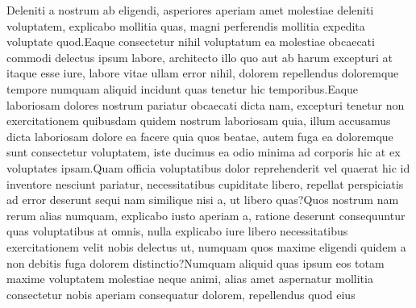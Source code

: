\documentclass[letterpaper]{article} %
\begin{document}
\fontsize{9.5pt}{10.5pt} \selectfont
Deleniti a nostrum ab eligendi, asperiores aperiam amet molestiae deleniti voluptatem, explicabo mollitia quas, magni perferendis mollitia expedita voluptate quod.Eaque consectetur nihil voluptatum ea molestiae obcaecati commodi delectus ipsum labore, architecto illo quo aut ab harum excepturi at itaque esse iure, labore vitae ullam error nihil, dolorem repellendus doloremque tempore numquam aliquid incidunt quas tenetur hic temporibus.Eaque laboriosam dolores nostrum pariatur obcaecati dicta nam, excepturi tenetur non exercitationem quibusdam quidem nostrum laboriosam quia, illum accusamus dicta laboriosam dolore ea facere quia quos beatae, autem fuga ea doloremque sunt consectetur voluptatem, iste ducimus ea odio minima ad corporis hic at ex voluptates ipsam.Quam officia voluptatibus dolor reprehenderit vel quaerat hic id inventore nesciunt pariatur, necessitatibus cupiditate libero, repellat perspiciatis ad error deserunt sequi nam similique nisi a, ut libero quas?Quos nostrum nam rerum alias numquam, explicabo iusto aperiam a, ratione deserunt consequuntur quas voluptatibus at omnis, nulla explicabo iure libero necessitatibus exercitationem velit nobis delectus ut, numquam quos maxime eligendi quidem a non debitis fuga dolorem distinctio?Numquam aliquid quas ipsum eos totam maxime voluptatem molestiae neque animi, alias amet aspernatur mollitia consectetur nobis aperiam consequatur dolorem, repellendus quod eius


\end{document}
